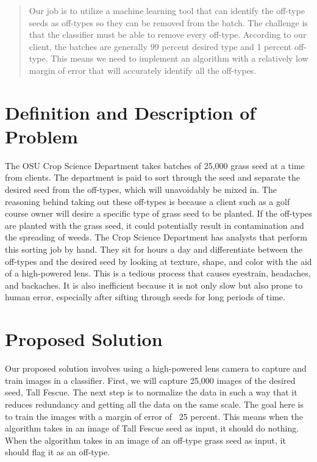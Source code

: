 \documentclass[onecolumn, draftclsnofoot,10pt, compsoc]{IEEEtran}
\begin{document}
\begin{titlepage}
\begin{singlespace}
\begin{abstract}
Our job is to utilize a machine learning tool that can identify the off-type seeds as off-types so they can be removed from the batch. The challenge is that the classifier must be able to remove every off-type. According to our client, the batches are generally 99 percent desired type and 1 percent off-type. This means we need to implement an algorithm with a relatively low margin of error that will accurately identify all the off-types.


        \end{abstract}
    \end{singlespace}
\end{titlepage}
\newpage
{}
\tableofcontents
\clearpage

\section{Definition and Description of Problem}
The OSU Crop Science Department takes batches of 25,000 grass seed at a time from clients. The department is paid to sort through the seed and separate the desired seed from the off-types, which will unavoidably be mixed in. The reasoning behind taking out these off-types is because a client such as a golf course owner will desire a specific type of grass seed to be planted. If the off-types are planted with the grass seed, it could potentially result in contamination and the spreading of weeds.
The Crop Science Department has analysts that perform this sorting job by hand. They sit for hours a day and differentiate between the off-types and the desired seed by looking at texture, shape, and color with the aid of a high-powered lens. This is a tedious process that causes eyestrain, headaches, and backaches. It is also inefficient because it is not only slow but also prone to human error, especially after sifting through seeds for long periods of time.

\section{Proposed Solution}
Our proposed solution involves using a high-powered lens camera to capture and train images in a classifier. First, we will capture 25,000 images of the desired seed, Tall Fescue. The next step is to normalize the data in such a way that it reduces redundancy and getting all the data on the same scale. The goal here is to train the images with a margin of error of ~25 percent. This means when the algorithm takes in an image of Tall Fescue seed as input, it should do nothing. When the algorithm takes in an image of an off-type grass seed as input, it should flag it as an off-type.
\end{document}
